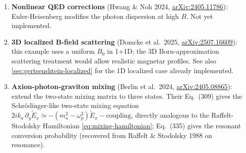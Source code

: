 \begin{enumerate}
  \item \textbf{Nonlinear QED corrections} (Hwang \& Noh 2024,
    \href{https://arxiv.org/abs/2405.11786}{arXiv:2405.11786}):
    Euler-Heisenberg modifies the photon dispersion at high $B$. Not
    yet implemented.
  \item \textbf{3D localized B-field scattering} (Domcke et al.\ 2025,
    \href{https://arxiv.org/abs/2507.16609}{arXiv:2507.16609}): this
    example uses a uniform $B_0$ in 1+1D; the 3D Born-approximation
    scattering treatment would allow realistic magnetar profiles. See
    also \cref{sec:gertsenshtein-localized} for the 1D localized case
    already implemented.
  \item \textbf{Axion-photon-graviton mixing} (Berlin et al.\ 2024,
    \href{https://arxiv.org/abs/2405.08865}{arXiv:2405.08865}): extend
    the two-state mixing matrix to three states. Their Eq.~(309) gives
    the Schrödinger-like two-state mixing equation
    $2ik_a\,\partial_y\tilde{E}_x \simeq -(m_a^2-\omega_p^2)\tilde{E}_x
    - \mathrm{coupling}$, directly analogous to the Raffelt-Stodolsky
    Hamiltonian \eqref{eq:mixing-hamiltonian}; Eq.~(335) gives the
    resonant conversion probability (recovered from Raffelt \& Stodolsky
    1988 on resonance).
\end{enumerate}
